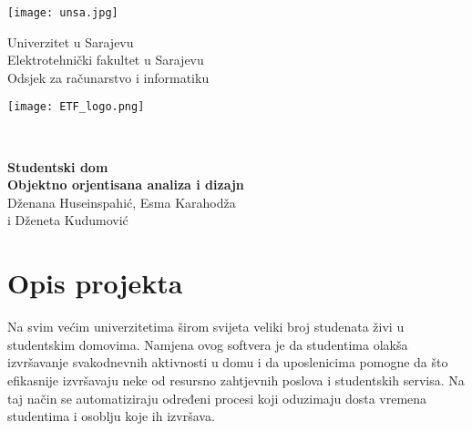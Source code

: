 \documentclass{article}
\begin{document}
	\begin{titlepage}
		\newcommand{\HRule}{\rule{\linewidth}{1mm}} 
		\noindent
		{\large
		\begin{minipage}{0.2\textwidth}
				\begin{center} 
					\texttt{[image: unsa.jpg]}
				\end{center}
			\end{minipage}
			\begin{minipage}{0.58\textwidth}
				\begin{center} \large
					Univerzitet u Sarajevu\\
					Elektrotehnički fakultet u Sarajevu\\
					Odsjek za računarstvo i informatiku\\
				\end{center}
			\end{minipage}
			\begin{minipage}{0.2\textwidth}
				\begin{center} 
					\texttt{[image: ETF\_logo.png]}
				\end{center}
			\end{minipage}
			\\[6 cm] 
			\begin{minipage}{0.2\textwidth}
				\begin{center} 
					
				\end{center}
			\end{minipage}
		
			
			
			\begin{center}
				\LARGE 
				\textbf{Studentski dom} \\
				\large 
				\textbf{Objektno orjentisana analiza i dizajn}
				\\
				Dženana Huseinspahić, Esma Karahodža \\
				i Dženeta Kudumović
				\\[3.0 cm] 
				
			\end{center}	 		
		}
	\end{titlepage}


\renewcommand{\contentsname}{Sadržaj}
\tableofcontents

\newpage

\section{Opis projekta}
\hspace{\indent}Na svim većim univerzitetima širom svijeta veliki broj studenata živi u studentskim domovima. Namjena ovog softvera je da studentima olakša izvršavanje svakodnevnih aktivnosti u domu i da uposlenicima pomogne da što efikasnije izvršavaju neke od resursno zahtjevnih poslova i studentskih servisa. Na taj način se automatiziraju određeni procesi koji oduzimaju dosta vremena studentima i osoblju koje ih izvršava.
\end{document}
